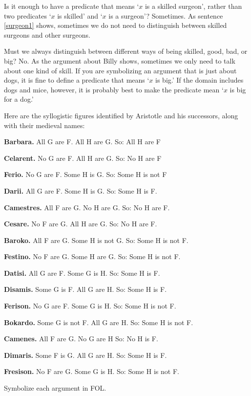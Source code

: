Is it enough to have a predicate that means `$x$ is a skilled surgeon', rather than two predicates `$x$ is skilled' and `$x$ is a surgeon'? Sometimes. As sentence \ref{surgeon1} shows, sometimes we do not need to distinguish between skilled surgeons and other surgeons.

Must we always distinguish between different ways of being skilled, good, bad, or big? No. As the argument about Billy shows, sometimes we only need to talk about one kind of skill. If you are symbolizing an argument that is just about dogs, it is fine to define a predicate that means `$x$ is big.' If the domain includes dogs and mice, however, it is probably best to make the predicate mean `$x$ is big for a dog.'



\practiceproblems
\problempart
\label{pr.BarbaraEtc}
Here are the syllogistic figures identified by Aristotle and his successors, along with their medieval names:
\begin{ebullet}
	\item \textbf{Barbara.} All G are F. All H are G. So:  All H are F
	\item \textbf{Celarent.} No G are F. All H are G. So: No H are F
	\item \textbf{Ferio.} No G are F. Some H is G. So: Some H is not F
	\item \textbf{Darii.} All G are F. Some H is G. So: Some H is F.
	\item \textbf{Camestres.} All F are G. No H are G. So: No H are F.
	\item \textbf{Cesare.} No F are G. All H are G. So: No H are F.
	\item \textbf{Baroko.} All F are G. Some H is not G. So: Some H is not F.
	\item \textbf{Festino.} No F are G. Some H are G. So: Some H is not F.
	\item \textbf{Datisi.} All G are F. Some G is H. So: Some H is F.
	\item \textbf{Disamis.} Some G is F. All G are H. So: Some H is F.
	\item \textbf{Ferison.} No G are F. Some G is H. So: Some H is not F.
	\item \textbf{Bokardo.} Some G is not F. All G are H. So:  Some H is not F.
	\item \textbf{Camenes.} All F are G. No G are H So: No H is F.
	\item \textbf{Dimaris.} Some F is G. All G are H. So: Some H is F.
	\item \textbf{Fresison.} No F are G. Some G is H. So: Some H is not F.
\end{ebullet}
Symbolize each argument in FOL.

